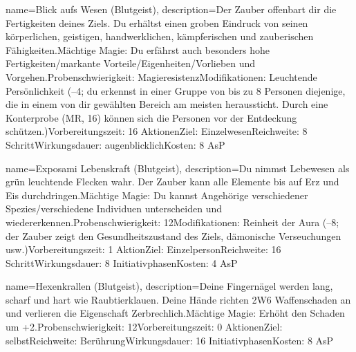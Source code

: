 {
    name={Blick aufs Wesen (Blutgeist)},
    description={Der Zauber offenbart dir die Fertigkeiten deines Ziels. Du erhältst einen groben Eindruck von seinen körperlichen, geistigen, handwerklichen, kämpferischen und zauberischen Fähigkeiten.\newline Mächtige Magie: Du erfährst auch besonders hohe Fertigkeiten/markante Vorteile/Eigenheiten/Vorlieben und Vorgehen.\newline Probenschwierigkeit: Magieresistenz\newline Modifikationen: Leuchtende Persönlichkeit (–4; du erkennst in einer Gruppe von bis zu 8 Personen diejenige, die in einem von dir gewählten Bereich am meisten heraussticht. Durch eine Konterprobe (MR, 16) können sich die Personen vor der Entdeckung schützen.)\newline Vorbereitungszeit: 16 Aktionen\newline Ziel: Einzelwesen\newline Reichweite: 8 Schritt\newline Wirkungsdauer: augenblicklich\newline Kosten: 8 AsP}
}


{
    name={Exposami Lebenskraft (Blutgeist)},
    description={Du nimmst Lebewesen als grün leuchtende Flecken wahr. Der Zauber kann alle Elemente bis auf Erz und Eis durchdringen.\newline Mächtige Magie: Du kannst Angehörige verschiedener Spezies/verschiedene Individuen unterscheiden und wiedererkennen.\newline Probenschwierigkeit: 12\newline Modifikationen: Reinheit der Aura (–8; der Zauber zeigt den Gesundheitszustand des Ziels, dämonische Verseuchungen usw.)\newline Vorbereitungszeit: 1 Aktion\newline Ziel: Einzelperson\newline Reichweite: 16 Schritt\newline Wirkungsdauer: 8 Initiativphasen\newline Kosten: 4 AsP}
}


{
    name={Hexenkrallen (Blutgeist)},
    description={Deine Fingernägel werden lang, scharf und hart wie Raubtierklauen. Deine Hände richten 2W6 Waffenschaden an und verlieren die Eigenschaft Zerbrechlich.\newline Mächtige Magie: Erhöht den Schaden um +2.\newline Probenschwierigkeit: 12\newline Vorbereitungszeit: 0 Aktionen\newline Ziel: selbst\newline Reichweite: Berührung\newline Wirkungsdauer: 16 Initiativphasen\newline Kosten: 8 AsP}
}


